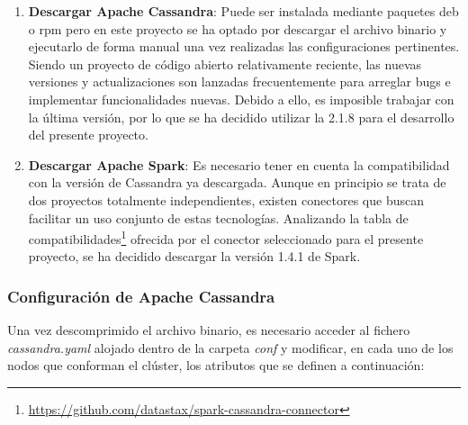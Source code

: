 \begin{enumerate}
\item \textbf{Descargar Apache Cassandra}: Puede ser instalada mediante paquetes deb o rpm pero en este proyecto se ha optado por descargar el archivo binario y ejecutarlo de forma manual una vez realizadas las configuraciones pertinentes.\\ 

Siendo un proyecto de código abierto relativamente reciente, las nuevas versiones y actualizaciones son lanzadas frecuentemente para arreglar bugs e implementar funcionalidades nuevas. Debido a ello, es imposible trabajar con la última versión, por lo que se ha decidido utilizar la 2.1.8 para el desarrollo del presente proyecto.

\item \textbf{Descargar Apache Spark}: Es necesario tener en cuenta la compatibilidad con la versión de Cassandra ya descargada. Aunque en principio se trata de dos proyectos totalmente independientes, existen conectores que buscan facilitar un uso conjunto de estas tecnologías. Analizando la tabla de compatibilidades\footnote{\url{https://github.com/datastax/spark-cassandra-connector}} ofrecida por el conector seleccionado para el presente proyecto, se ha decidido descargar la versión 1.4.1 de Spark.
	
\end{enumerate}

\subsubsection{Configuración de Apache Cassandra}

Una vez descomprimido el archivo binario, es necesario acceder al fichero \textit{cassandra.yaml} alojado dentro de la carpeta \textit{conf} y modificar, en cada uno de los nodos que conforman el clúster, los atributos que se definen a continuación:

